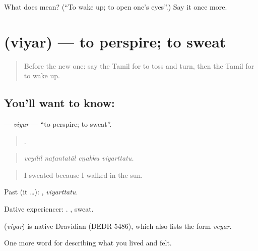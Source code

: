 \begin{tcolorbox}[breakable,colback=teal!4,colframe=teal!35!black,title={Before you move on}]
What does  mean? (\textquotedblleft{}To wake up; to open one’s eyes\textquotedblright{}.) Say it once more.
\end{tcolorbox}
\section[\texorpdfstring{\ta{வியர்} (viyar)}{வியர் (viyar)}]{ (viyar) — to perspire; to sweat}

\label{lesson:TA-C489-viyar}



\begin{quote}
Before the new one: say the Tamil for to toss and turn, then the Tamil for to wake up.
\end{quote}

\subsection*{You'll want to know: }
\textbf{} — \emph{viyar} — \textquotedblleft{}to perspire; to sweat\textquotedblright{}.

\begin{quote}
   .
\end{quote}

\begin{quote}
\emph{veyilil naṭantatāl eṉakku viyarttatu.}
\end{quote}

\begin{quote}
I sweated because I walked in the sun.
\end{quote}

Past (it …): , \emph{viyarttatu}.

Dative experiencer:  . , sweat.

\begin{cousinweb}
\textbf{} (\emph{viyar}) is native Dravidian (DEDR 5486), which also lists the form  \emph{veyar}.
\end{cousinweb}

\begin{grammarlens}[title={What you've built}]
One more word for describing what you lived and felt.
\end{grammarlens}

